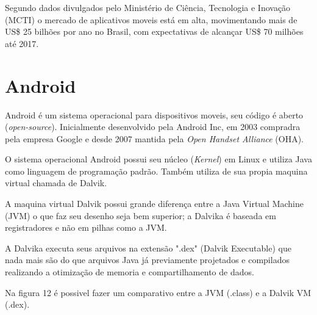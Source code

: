 Segundo dados divulgados pelo Ministério de Ciência, Tecnologia e Inovação (MCTI) o mercado de aplicativos moveis está em alta, movimentando mais de US\$ 25 bilhões por ano no Brasil, com expectativas de alcançar US\$ 70 milhões até 2017.
	
	

	

\section{Android}
\label{sec:Android}
Android é um sistema operacional para dispositivos moveis, seu código é aberto (\textit{open-source}).
Inicialmente desenvolvido pela Android Inc, em 2003 compradra pela empresa Google e desde 2007 mantida pela \textit{Open Handset Alliance} (OHA).

O sistema operacional Android possui seu núcleo (\textit{Kernel}) em Linux e utiliza Java como linguagem de programação padrão. Também utiliza de sua propia maquina virtual chamada de Dalvik.


A maquina virtual Dalvik possui grande diferença entre a Java Virtual Machine (JVM) o que faz seu desenho seja bem superior; a Dalvika é baseada em registradores e não em pilhas como a JVM.


A Dalvika executa seus arquivos na extensão ".dex" (Dalvik Executable) que nada mais são do que arquivos Java já previamente projetados e compilados realizando a otimização de memoria e compartilhamento de dados.


Na figura 12 é possivel fazer um comparativo entre a JVM (.class) e a Dalvik VM (.dex).

